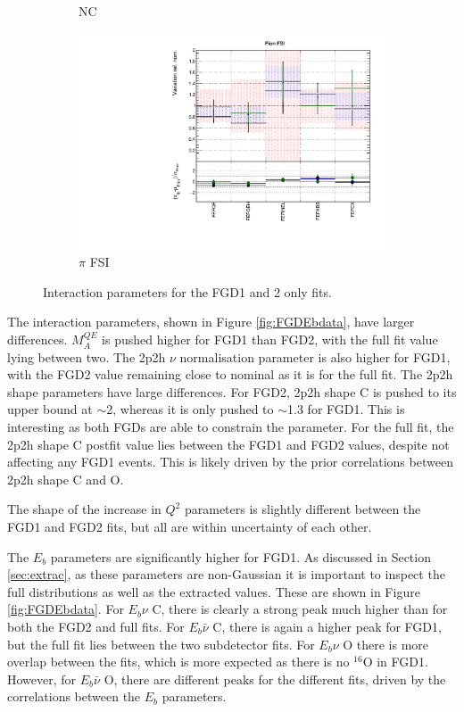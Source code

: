 \begin{figure}
\begin{subfigure}{0.49\textwidth}
  \caption{NC}
\end{subfigure}
\begin{subfigure}{0.49\textwidth}
  \centering
  \includegraphics[width=0.9\linewidth]{figs/fgdfitsxsec_5}
  \caption{$\pi$ FSI}
\end{subfigure}
\caption{Interaction parameters for the FGD1 and 2 only fits.}
\label{fig:fgdxsec}
\end{figure}

The interaction parameters, shown in Figure \ref{fig:FGDEbdata}, have larger differences. $M_{A}^{QE}$ is pushed higher for FGD1 than FGD2, with the full fit value lying between two. The 2p2h $\nu$ normalisation parameter is also higher for FGD1, with the FGD2 value remaining close to nominal as it is for the full fit. The 2p2h shape parameters have large differences. For FGD2, 2p2h shape C is pushed to its upper bound at $\sim$2, whereas it is only pushed to $\sim$1.3 for FGD1. This is interesting as both FGDs are able to constrain the parameter. For the full fit, the 2p2h shape C postfit value lies between the FGD1 and FGD2 values, despite not affecting any FGD1 events. This is likely driven by the prior correlations between 2p2h shape C and O.

The shape of the increase in $Q^2$ parameters is slightly different between the FGD1 and FGD2 fits, but all are within uncertainty of each other.

The $E_b$ parameters are significantly higher for FGD1. As discussed in Section \ref{sec:extrac}, as these parameters are non-Gaussian it is important to inspect the full distributions as well as the extracted values. These are shown in Figure \ref{fig:FGDEbdata}. For $E_b \nu$ C, there is clearly a strong peak much higher than for both the FGD2 and full fits. For $E_b \bar{\nu}$ C, there is again a higher peak for FGD1, but the full fit lies between the two subdetector fits. For $E_b \nu$ O there is more overlap between the fits, which is more expected as there is no $^{16}$O in FGD1. However, for $E_b \bar{\nu}$ O, there are different peaks for the different fits, driven by the correlations between the $E_b$ parameters.

